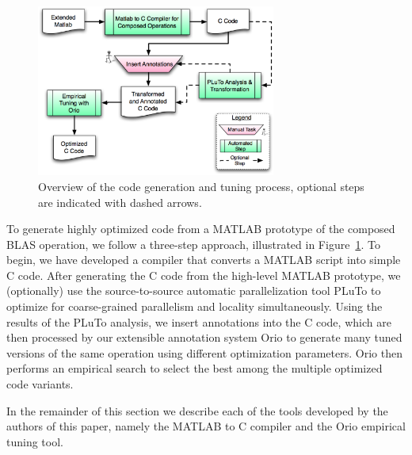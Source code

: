 \documentclass[runningheads]{llncs}
\begin{document}



\begin{figure}[htbp]
\centering
\includegraphics[width=0.7\textwidth]{figures/process.eps}
\caption{Overview of the code generation and tuning process, optional steps are indicated with dashed arrows.}
\label{fig:process}
\end{figure}
To generate highly optimized code from a MATLAB prototype of the composed BLAS operation, we follow a three-step approach, illustrated in Figure~\ref{fig:process}.  To begin, we have developed a compiler that converts a MATLAB script into simple C code.
After generating the C code from the high-level MATLAB prototype, we (optionally) use the source-to-source automatic parallelization tool PLuTo\cite{Pluto} %
to optimize for coarse-grained parallelism and locality simultaneously. Using the results of the PLuTo analysis, we insert annotations into the C code, which are then processed by our extensible annotation system Orio to generate many tuned versions of the same operation using different optimization parameters. Orio then performs an empirical search to select the best among the multiple optimized code variants.


In the remainder of this section we describe each of the tools developed by the authors of this paper, namely the MATLAB to C compiler and the Orio empirical tuning tool.
\end{document}
